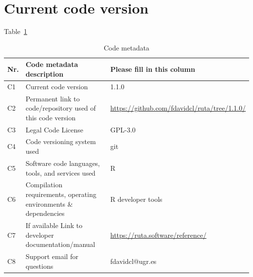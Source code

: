 \section*{Current code version}

Table~\ref{p2tbl.code}

\begin{table}[!h]
\begin{tabular}{|l|p{6.5cm}|p{6.5cm}|}
\hline
\textbf{Nr.} & \textbf{Code metadata description} & \textbf{Please fill in this column} \\
\hline
C1 & Current code version & 1.{1.0} \\
\hline
C2 & Permanent link to code/repository used of this code version & {\url{https://github.com/fdavidcl/ruta/tree/1.1.0/}} \\
\hline
C3 & Legal Code License   & GPL-3.0 \\
\hline
C4 & Code versioning system used & git \\
\hline
C5 & Software code languages, tools, and services used & R \\
\hline
C6 & Compilation requirements, operating environments \& dependencies & R developer tools \\
\hline
C7 & If available Link to developer documentation/manual & \url{https://ruta.software/reference/} \\
\hline
C8 & Support email for questions & fdavidcl@ugr.es \\
\hline
\end{tabular}
\caption{Code metadata}
\label{p2tbl.code} 
\end{table}

% 
